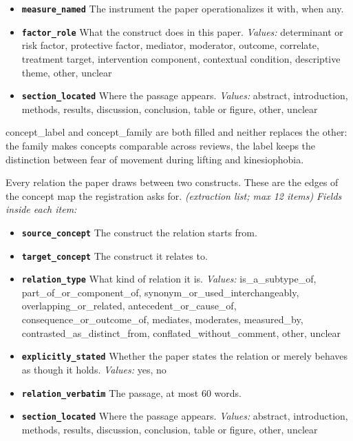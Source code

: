 \documentclass[11pt]{article}
\begin{document}
\begin{description}
\begin{itemize}[leftmargin=1.3em,itemsep=1pt,topsep=2pt]
  \item \textbf{\texttt{measure\_named}} The instrument the paper operationalizes it with, when any.
  \item \textbf{\texttt{factor\_role}} What the construct does in this paper. {\small \textit{Values:} determinant or risk factor, protective factor, mediator, moderator, outcome, correlate, treatment target, intervention component, contextual condition, descriptive theme, other, unclear}
  \item \textbf{\texttt{section\_located}} Where the passage appears. {\small \textit{Values:} abstract, introduction, methods, results, discussion, conclusion, table or figure, other, unclear}
  \end{itemize}
{\small concept\_label and concept\_family are both filled and neither replaces the other: the family makes concepts comparable across reviews, the label keeps the distinction between fear of movement during lifting and kinesiophobia.}
\item[\texttt{concept\_relations}] Every relation the paper draws between two constructs. These are the edges of the concept map the registration asks for. \textit{(extraction list; max 12 items)}
  {\small\itshape Fields inside each item:}
  \begin{itemize}[leftmargin=1.3em,itemsep=1pt,topsep=2pt]
  \item \textbf{\texttt{source\_concept}} The construct the relation starts from.
  \item \textbf{\texttt{target\_concept}} The construct it relates to.
  \item \textbf{\texttt{relation\_type}} What kind of relation it is. {\small \textit{Values:} is\_a\_subtype\_of, part\_of\_or\_component\_of, synonym\_or\_used\_interchangeably, overlapping\_or\_related, antecedent\_or\_cause\_of, consequence\_or\_outcome\_of, mediates, moderates, measured\_by, contrasted\_as\_distinct\_from, conflated\_without\_comment, other, unclear}
  \item \textbf{\texttt{explicitly\_stated}} Whether the paper states the relation or merely behaves as though it holds. {\small \textit{Values:} yes, no}
  \item \textbf{\texttt{relation\_verbatim}} The passage, at most 60 words.
  \item \textbf{\texttt{section\_located}} Where the passage appears. {\small \textit{Values:} abstract, introduction, methods, results, discussion, conclusion, table or figure, other, unclear}
  \end{itemize}

\end{description}
\end{document}
